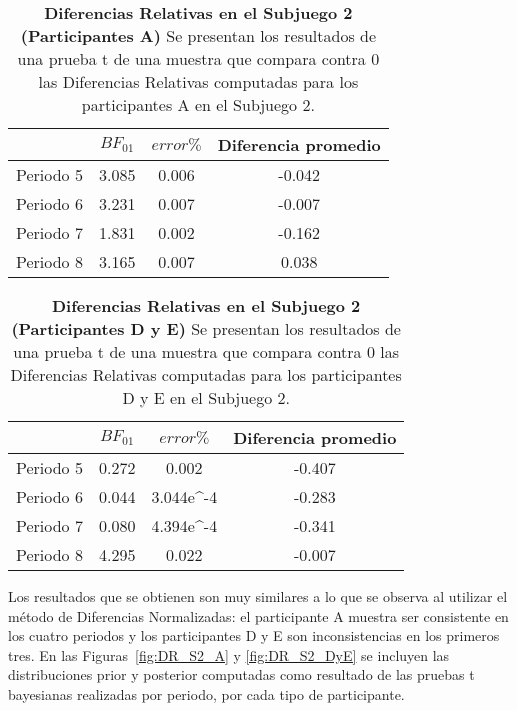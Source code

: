 \begin{table}[h]
\caption[Diferencias Relativas en el Subjuego 2; Participantes A (Pruebas t de una muestra)]{\textbf{Diferencias Relativas en el Subjuego 2 (Participantes A)} Se presentan los resultados de una prueba t de una muestra que compara contra 0 las Diferencias Relativas computadas para los participantes A en el Subjuego 2.}
\label{DR-S2-A-B}
\centering
\begin{tabular}{l | c c | c}
\toprule
\textbf{} & \textbf{$BF_{01}$} & \textbf{$error\%$} & \textbf{Diferencia promedio}\\
\midrule
Periodo 5 & 3.085 & 0.006 & -0.042\\
Periodo 6 & 3.231 & 0.007 & -0.007\\
Periodo 7 & 1.831 & 0.002 & -0.162\\
Periodo 8 & 3.165 & 0.007 & 0.038\\
\bottomrule
\end{tabular}
\end{table}

\begin{table}[h]
\caption[Diferencias Relativas en el Subjuego 2; Participantes D y E (Pruebas t de una muestra)]{\textbf{Diferencias Relativas en el Subjuego 2 (Participantes D y E)} Se presentan los resultados de una prueba t de una muestra que compara contra 0 las Diferencias Relativas computadas para los participantes D y E en el Subjuego 2.}
\label{DR-S2-DyE-B}
\centering
\begin{tabular}{l | c c | c}
\toprule
\textbf{} & \textbf{$BF_{01}$} & \textbf{$error\%$} & \textbf{Diferencia promedio}\\
\midrule
Periodo 5 & 0.272 & 0.002 & -0.407\\
Periodo 6 & 0.044 & 3.044e^-4 & -0.283\\
Periodo 7 & 0.080 & 4.394e^-4 & -0.341\\
Periodo 8 & 4.295 & 0.022 & -0.007\\
\bottomrule
\end{tabular}
\end{table}
  
 Los resultados que se obtienen son muy similares a lo que se observa al utilizar el método de Diferencias Normalizadas: el participante A muestra ser consistente en los cuatro periodos y los participantes D y E son inconsistencias en los primeros tres. En las Figuras~\ref{fig:DR_S2_A} y \ref{fig:DR_S2_DyE} se incluyen las distribuciones prior y posterior computadas como resultado de las pruebas t bayesianas realizadas por periodo, por cada tipo de participante.\\

